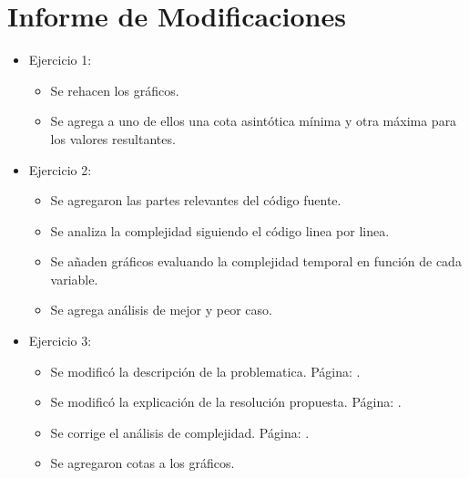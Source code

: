 \section{Informe de Modificaciones}

\begin{itemize}

	\item Ejercicio 1:
	\begin{itemize}
		\item Se rehacen los gráficos.
		\item Se agrega a uno de ellos una cota asintótica mínima y otra máxima para los valores resultantes.
	\end{itemize}
	
	\item Ejercicio 2:
	\begin{itemize}
		\item Se agregaron las partes relevantes del código fuente.
		\item Se analiza la complejidad siguiendo el código linea por linea.
		\item Se a\~naden gráficos evaluando la complejidad temporal en función de cada variable.
		\item Se agrega análisis de mejor y peor caso.
	\end{itemize}
	
	\item Ejercicio 3:
	\begin{itemize}
		\item Se modificó la descripción de la problematica. Página: \pageref{descTres}.
		\item Se modificó la explicación de la resolución propuesta. Página: \pageref{agm}.
		\item Se corrige el análisis de complejidad. Página: \pageref{union}.
		\item Se agregaron cotas a los gráficos.
	\end{itemize}
\end{itemize}